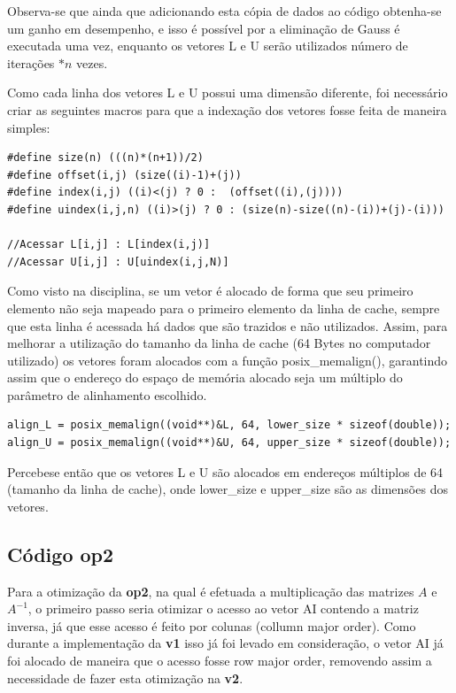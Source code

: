 \documentclass[12pt]{article}
\begin{document}
Observa-se que ainda que adicionando esta cópia de dados ao código obtenha-se um ganho em desempenho, e isso é possível por a eliminação de Gauss é executada uma vez, enquanto os vetores L e U serão utilizados número de iterações $* n$ vezes.

Como cada linha dos vetores L e U possui uma dimensão diferente, foi necessário criar as seguintes macros para que a indexação dos vetores fosse feita de maneira simples:

\begin{lstlisting}
#define size(n) (((n)*(n+1))/2)
#define offset(i,j) (size((i)-1)+(j))
#define index(i,j) ((i)<(j) ? 0 :  (offset((i),(j))))
#define uindex(i,j,n) ((i)>(j) ? 0 : (size(n)-size((n)-(i))+(j)-(i)))

//Acessar L[i,j] : L[index(i,j)]
//Acessar U[i,j] : U[uindex(i,j,N)]
\end{lstlisting}

Como visto na disciplina, se um vetor é alocado de forma que seu primeiro elemento não seja mapeado para o primeiro elemento da linha de cache, sempre que esta linha é acessada há dados que são trazidos e não utilizados. Assim, para melhorar a utilização do tamanho da linha de cache (64 Bytes no computador utilizado) os vetores foram alocados com a função posix\_memalign(), garantindo assim que o endereço do espaço de memória alocado seja um múltiplo do parâmetro de alinhamento escolhido.

\begin{lstlisting}
align_L = posix_memalign((void**)&L, 64, lower_size * sizeof(double));
align_U = posix_memalign((void**)&U, 64, upper_size * sizeof(double));
\end{lstlisting}

Percebe\-se então que os vetores L e U são alocados em endereços múltiplos de 64 (tamanho da linha de cache), onde lower\_size e upper\_size são as dimensões dos vetores.

\subsection{Código op2}

Para a otimização da \textbf{op2}, na qual é efetuada a multiplicação das matrizes $A$ e ${A}^{-1}$, o primeiro passo seria otimizar o acesso ao vetor AI contendo a matriz inversa, já que esse acesso é feito por colunas (collumn major order). Como durante a implementação da \textbf{v1} isso já foi levado em consideração, o vetor AI já foi alocado de maneira que o acesso fosse row major order, removendo assim a necessidade de fazer esta otimização na \textbf{v2}.
\end{document}
